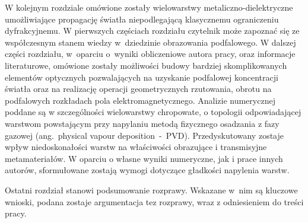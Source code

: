 W kolejnym rozdziale omówione zostały wielowarstwy metaliczno-dielektryczne umożliwiające propagację światła niepodlegającą klasycznemu ograniczeniu dyfrakcyjnemu. W pierwszych częściach rozdziału czytelnik może zapoznać się ze współczesnym stanem wiedzy w~dziedzinie obrazowania podfalowego. W dalszej części rozdziału, w~oparciu o~wyniki obliczeniowe autora pracy, oraz informacje literaturowe, omówione zostały możliwości budowy bardziej skomplikowanych elementów optycznych pozwalających na uzyskanie podfalowej koncentracji światła oraz na realizację operacji geometrycznych rzutowania, obrotu na podfalowych rozkładach pola elektromagnetycznego. Analizie numerycznej poddane są w szczególności wielowarstwy chropowate, o topologii odpowiadającej warstwom powstającym przy napylaniu metodą fizycznego osadzania z fazy gazowej (ang.~physical vapour deposition~-~PVD). Przedyskutowany zostaje wpływ niedoskonałości warstw na właściwości obrazujące i transmisyjne metamateriałów. W oparciu o własne wyniki numeryczne, jak i prace innych autorów, sformułowane zostają wymogi dotyczące gładkości napylenia warstw.

Ostatni rozdział stanowi podsumowanie rozprawy. Wskazane w~nim są kluczowe wnioski, podana zostaje argumentacja tez rozprawy, wraz z odniesieniem do treści pracy.
